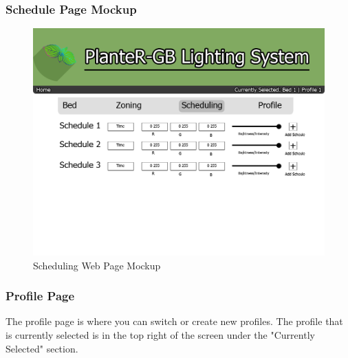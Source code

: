 			            \subsubsection{Schedule Page Mockup}
			            \begin{center}
			                \begin{figure}[H]
			                    \includegraphics[width=\linewidth]{web_design/SchedulingPage.png}
			                    \caption{Scheduling Web Page Mockup}
			                    \label{fig:Schedule Page}
			                \end{figure}
			            \end{center}
			            \subsubsection{Profile Page}
			            The profile page is where you can switch or create new profiles. The profile
			            that is currently selected is in the top right of the screen under the "Currently
			            Selected" section.
